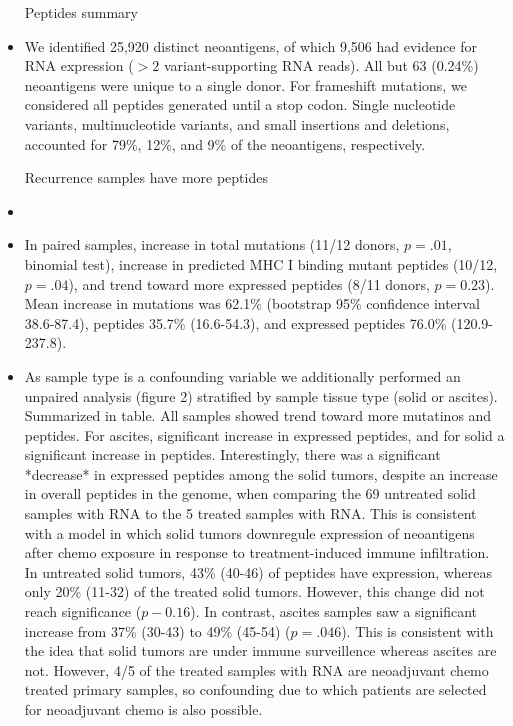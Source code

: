 \begin{itemize}
Peptides summary
\item We identified 25,920 distinct neoantigens, of which 9,506 had evidence for RNA expression ($>2$ variant-supporting RNA reads). All but 63 (0.24\%) neoantigens were unique to a single donor. For frameshift mutations, we considered all peptides generated until a stop codon. Single nucleotide variants, multinucleotide variants, and small insertions and deletions, accounted for 79\%, 12\%, and 9\% of the neoantigens, respectively.

Recurrence samples have more peptides
\item 
\item In paired samples, increase in total mutations (11/12 donors, $p=.01$, binomial test), increase in predicted MHC I binding mutant peptides (10/12, $p=.04$), and trend toward more expressed peptides (8/11 donors, $p=0.23$).  Mean increase in mutations was 62.1\% (bootstrap 95\% confidence interval 38.6-87.4), peptides 35.7\% (16.6-54.3), and expressed peptides 76.0\% (120.9-237.8).
\item As sample type is a confounding variable we additionally performed an unpaired analysis (figure 2) stratified by sample tissue type (solid or ascites). Summarized in table. All samples showed trend toward more mutatinos and peptides. For ascites, significant increase in expressed peptides, and for solid a significant increase in peptides. Interestingly, there was a significant *decrease* in expressed peptides among the solid tumors, despite an increase in overall peptides in the genome, when comparing the 69 untreated solid samples with RNA to the 5 treated samples with RNA.  This is consistent with a model in which solid tumors downregule expression of neoantigens after chemo exposure in response to treatment-induced immune infiltration. In untreated solid tumors, 43\% (40-46) of peptides have expression, whereas only 20\% (11-32) of the treated solid tumors. However, this change did not reach significance ($p-0.16$). In contrast, ascites samples saw a significant increase from 37\% (30-43) to 49\% (45-54) ($p=.046$). This is consistent with the idea that solid tumors are under immune surveillence whereas ascites are not. However, 4/5 of the treated samples with RNA are neoadjuvant chemo treated primary samples, so confounding due to which patients are selected for neoadjuvant chemo is also possible.



\end{itemize}
